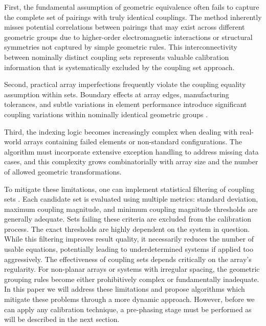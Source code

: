 \documentclass[journal]{IEEEtran}
\begin{document}
First, the fundamental assumption of geometric equivalence often fails to capture the complete set of pairings with truly identical couplings. The method inherently misses potential correlations between pairings that may exist across different geometric groups due to higher-order electromagnetic interactions or structural symmetries not captured by simple geometric rules. This interconnectivity between nominally distinct coupling sets represents valuable calibration information that is systematically excluded by the coupling set approach.

Second, practical array imperfections frequently violate the coupling equality assumption within sets. Boundary effects at array edges, manufacturing tolerances, and subtle variations in element performance introduce significant coupling variations within nominally identical geometric groups \cite{javier,lebron,bekers,diagnostic,sasser}.

Third, the indexing logic becomes increasingly complex when dealing with real-world arrays containing failed elements or non-standard configurations. The algorithm must incorporate extensive exception handling to address missing data cases, and this complexity grows combinatorially with array size and the number of allowed geometric transformations.

To mitigate these limitations, one can implement statistical filtering of coupling sets \cite{bekers}. Each candidate set is evaluated using multiple metrics: standard deviation, maximum coupling magnitude, and minimum coupling magnitude thresholds are generally adequate. Sets failing these criteria are excluded from the calibration process. The exact thresholds are highly dependent on the system in question. While this filtering improves result quality, it necessarily reduces the number of usable equations, potentially leading to underdetermined systems if applied too aggressively.
The effectiveness of coupling sets depends critically on the array's regularity. For non-planar arrays or systems with irregular spacing, the geometric grouping rules become either prohibitively complex or fundamentally inadequate. In this paper we will address these limitations and propose algorithms which mitigate these problems through a more dynamic approach. However, before we can apply any calibration technique, a pre-phasing stage must be performed \cite{bekers,javier,sasser} as will be described in the next section.
\end{document}
